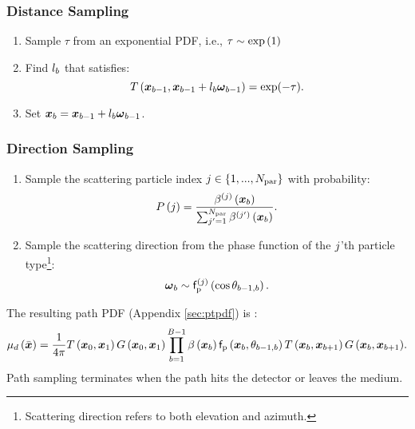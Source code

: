 \documentclass{article}
\begin{document}
\subsubsection{Distance Sampling}
\label{sec:distance_sampling}
\begin{enumerate}
    \item Sample $\tau$ from an exponential \ac{PDF}, i.e., $\tau\sim\exp\left({1}\right)$
    \item Find $l_{b}$ that satisfies:    
    \begin{equation}
    T\left({{\boldsymbol{x}_{b-1}},{\boldsymbol{x}_{b-1}+l_{b}\boldsymbol{\omega}_{b-1}}}\right)=\exp(-\tau).
    \end{equation}
    \item Set $\boldsymbol{x}_{b}=\boldsymbol{x}_{b-1}+l_{b}\boldsymbol{\omega}_{b-1}$.
\end{enumerate}
\subsubsection{Direction Sampling}
\label{sec:direction_sampling}
\begin{enumerate}
    \item Sample the scattering particle index $j \in \left\{ {1,...,N_{\text{par}}}\right\}$ with probability:
    \begin{equation}
    P\left({j}\right)=\frac{\beta^{\left({j}\right)}\left({\boldsymbol{x}_{b}}\right)}{\sum_{j'=1}^{N_{\text{par}}}{\beta^{\left({j'}\right)}\left({\boldsymbol{x}_{b}}\right)}}.
    \end{equation}
    \item Sample the scattering direction from the phase function of the $j$'th particle type\footnote{Scattering direction refers to both elevation and azimuth.}: $$\boldsymbol{\omega}_{b}\sim\mathsf{f}_{\text{p}}^{\left({j}\right)}\left({\cos\theta_{b-1,b}}\right).$$
\end{enumerate}
The resulting path \ac{PDF} (Appendix \ref{sec:ptpdf}) is :
\begin{equation}
\label{eq:final_mu}
\mu_{d}\left({\Bar{\boldsymbol{x}}}\right) =\frac{1}{4\pi}T\left({{\boldsymbol{x}_{0}},{\boldsymbol{x}_{1}}}\right)G\left({\boldsymbol{x}_{0},\boldsymbol{x}_{1}}\right)\prod_{b=1}^{B-1}{\beta\left({\boldsymbol{x}_{b}}\right)\mathsf{f}_{\text{p}}\left({\boldsymbol{x}_{b},\theta_{b-1,b}}\right) T\left({{\boldsymbol{x}_{b}},{\boldsymbol{x}_{b+1}}}\right)G\left({\boldsymbol{x}_{b},\boldsymbol{x}_{b+1}}\right)}.
\end{equation}
Path sampling terminates when the path hits the detector or leaves the medium.
\end{document}

